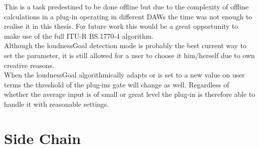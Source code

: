 This is a task predestined to be done offline but due to the complexity of offline calculations in a plug-in operating in different DAWs the time was not enough to realise it in this thesis. For future work this would be a great opportunity to make use of the full ITU-R BS.1770-4 algorithm.\\
Although the loudnessGoal detection mode is probably the best current way to set the parameter, it is still allowed for a user to choose it him/herself due to own creative reasons.\\
When the loudnessGoal algorithmically adapts or is set to a new value on user terms the threshold of the plug-ins gate will change as well. Regardless of whether the average input is of small or great level the plug-in is therefore able to handle it with reasonable settings.\\

\section{Side Chain}

